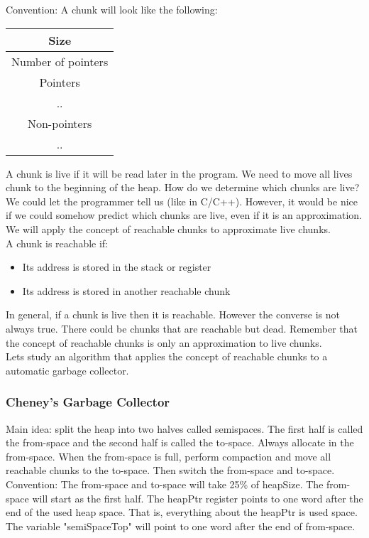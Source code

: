 \documentclass[12pt, letterpaper]{article}
\begin{document}
Convention: A chunk will look like the following:
\begin{center}
\begin{tabular}{|c|}
\hline
Size\\
\hline
Number of pointers\\
\hline
Pointers\\
..\\
\hline
Non-pointers\\
..\\
\hline
\end{tabular}
\end{center}

A chunk is live if it will be read later in the program. We need to move all lives chunk to the beginning of the heap. How do we determine which chunks are live? We could let the programmer tell us (like in C/C++). However, it would be nice if we could somehow predict which chunks are live, even if it is an approximation. We will apply the concept of reachable chunks to approximate live chunks.\\

A chunk is reachable if:
\begin{itemize}
\item Its address is stored in the stack or register
\item Its address is stored in another reachable chunk
\end{itemize}

In general, if a chunk is live then it is reachable. However the converse is not always true. There could be chunks that are reachable but dead. Remember that the concept of reachable chunks is only an approximation to live chunks.\\

Lets study an algorithm that applies the concept of reachable chunks to a automatic garbage collector.

\subsubsection{Cheney's Garbage Collector}
Main idea: split the heap into two halves called semispaces. The first half is called the from-space and the second half is called the to-space. Always allocate in the from-space. When the from-space is full, perform compaction and move all reachable chunks to the to-space. Then switch the from-space and to-space.\\

Convention: The from-space and to-space will take 25\% of heapSize. The from-space will start as the first half. The heapPtr register points to one word after the end of the used heap space. That is, everything about the heapPtr is used space. The variable "semiSpaceTop" will point to one word after the end of from-space. \\
\end{document}
